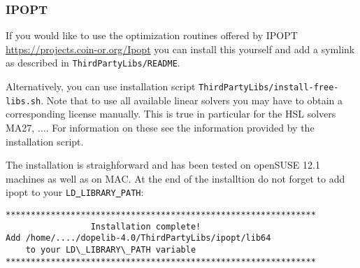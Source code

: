 \subsubsection{IPOPT}
If you would like to use the optimization routines offered by IPOPT
\url{https://projects.coin-or.org/Ipopt} you can  
install this yourself and add a symlink as described in \texttt{ThirdPartyLibs/README}.

Alternatively, you can use installation script
\texttt{ThirdPartyLibs/install-free-libs.sh}. Note that to use all 
available linear solvers you may have to obtain a corresponding license 
manually. This is true in particular for the HSL solvers MA27, $\ldots$.
For information on these see the information provided by the installation
script.

The installation is straighforward and has been tested on openSUSE 12.1
machines as well as on MAC. At the end of the installtion do not forget to
add ipopt to your \texttt{LD\underline{ }LIBRARY\underline{ }PATH}:
\begin{lstlisting}
**************************************************************
                 Installation complete!
Add /home/..../dopelib-4.0/ThirdPartyLibs/ipopt/lib64
    to your LD\_LIBRARY\_PATH variable
**************************************************************
\end{lstlisting}


